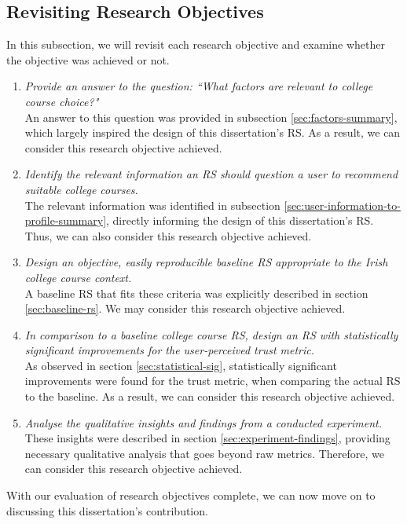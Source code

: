 \subsection{Revisiting Research Objectives}

In this subsection, we will revisit each research objective and examine whether the objective was achieved or not.

\begin{enumerate}
    \item \emph{Provide an answer to the question: ``What factors are relevant to college course choice?"}\\An answer to this question was provided in subsection \ref{sec:factors-summary}, which largely inspired the design of this dissertation's RS. As a result, we can consider this research objective achieved.
    \item \emph{Identify the relevant information an RS should question a user to recommend suitable college courses.}\\The relevant information was identified in subsection \ref{sec:user-information-to-profile-summary}, directly informing the design of this dissertation's RS. Thus, we can also consider this research objective achieved.
    \item \emph{Design an objective, easily reproducible baseline RS appropriate to the Irish college course context.}\\A baseline RS that fits these criteria was explicitly described in section \ref{sec:baseline-rs}. We may consider this research objective achieved.
    \item \emph{In comparison to a baseline college course RS, design an RS with statistically significant improvements for the user-perceived trust metric.}\\As observed in section \ref{sec:statistical-sig}, statistically significant improvements were found for the trust metric, when comparing the actual RS to the baseline. As a result, we can consider this research objective achieved.
    \item \emph{Analyse the qualitative insights and findings from a conducted experiment.}\\These insights were described in section \ref{sec:experiment-findings}, providing necessary qualitative analysis that goes beyond raw metrics. Therefore, we can consider this research objective achieved.
\end{enumerate}

With our evaluation of research objectives complete, we can now move on to discussing this dissertation's contribution.

